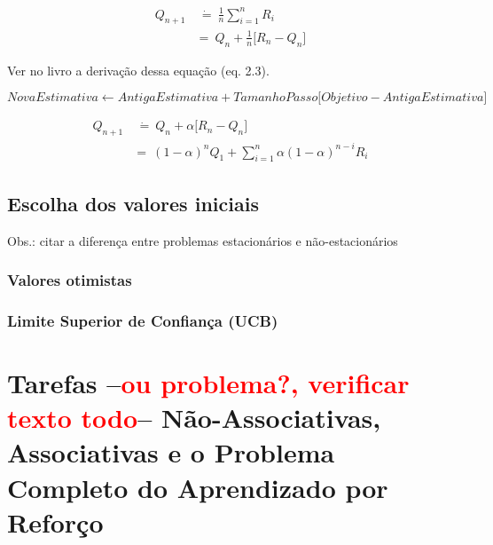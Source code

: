 \documentclass{article}
\newcommand{\todo}[1]{ --\textcolor{red}{\textbf{#1}}--}
\begin{document}
            \begin{equation}
            \begin{split}
                Q_{n+1} & \ \dot{=} \ \frac{1}{n} \sum_{i=1}^{n} R_i \\
                & = \ Q_n + \frac{1}{n} \Big[ R_n - Q_n \Big]
            \end{split}
            \end{equation}
            
            Ver no livro a derivação dessa equação (eq. 2.3).
            
            \begin{equation}
                NovaEstimativa \leftarrow AntigaEstimativa + TamanhoPasso \Big[ Objetivo - AntigaEstimativa \Big]
            \end{equation}
            
            \begin{equation}
            \begin{split}
                Q_{n+1} & \ \dot{=} \ Q_n + \alpha \Big[ R_n - Q_n \Big] \\
                & = \ (1 - \alpha)^n Q_1 + \sum_{i=1}^{n} \alpha (1 - \alpha)^{n - i} R_i
            \end{split}
            \end{equation}
            
        \subsection{Escolha dos valores iniciais}
            
            Obs.: citar a diferença entre problemas estacionários e não-estacionários
            
            \subsubsection{Valores otimistas}
            
            \subsubsection{Limite Superior de Confiança (UCB)}
            
    \section{Tarefas \todo{ou problema?, verificar texto todo} Não-Associativas, Associativas e o Problema Completo do Aprendizado por Reforço}
    
\end{document}
